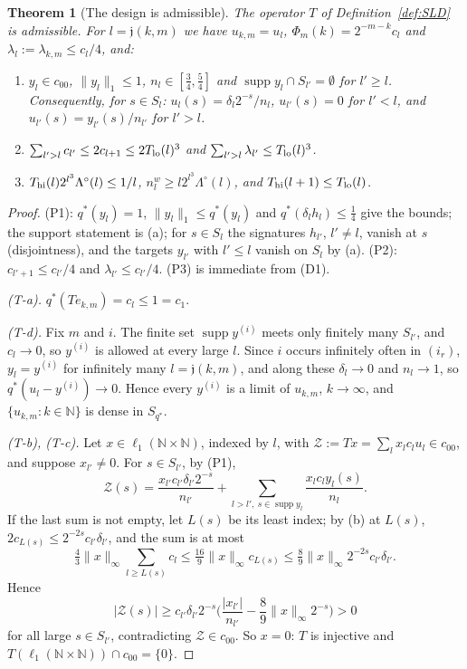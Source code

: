 \documentclass[10pt]{amsart}
\newtheorem{theorem}{Theorem}[section]
\theoremstyle{definition}
\theoremstyle{remark}
\newcommand{\supp}{\operatorname{supp}}
\newcommand{\N}{\mathbb N}
\begin{document}
\begin{theorem}[The design is admissible]\label{thm:SLD}
The operator $T$ of Definition~\ref{def:SLD} is admissible.  For
$l=\mathfrak j(k,m)$ we have $u_{k,m}=u_l$, $\Phi_m(k)=2^{-m-k}c_l$ and
$\lambda_l:=\lambda_{k,m}\le c_l/4$, and:
\begin{enumerate}
\item[(P1)] $y_l\in c_{00}$, $\|y_l\|_1\le1$, $n_l\in[\frac34,\frac54]$ and
$\supp y_l\cap S_{l'}=\emptyset$ for $l'\ge l$.  Consequently, for
$s\in S_l$: $u_l(s)=\delta_l2^{-s}/n_l$, $u_{l'}(s)=0$ for $l'<l$, and
$u_{l'}(s)=y_{l'}(s)/n_{l'}$ for $l'>l$.
\item[(P2)] $\sum_{l'>l}c_{l'}\le2c_{l+1}\le2T_{\rm lo}(l)^3$ and
$\sum_{l'>l}\lambda_{l'}\le T_{\rm lo}(l)^3$.
\item[(P3)] $T_{\rm hi}(l)2^{l^3}\Lambda^\circ(l)\le1/l$,
$n^w_l\ge l2^{l^3}\Lambda^\circ(l)$, and $T_{\rm hi}(l+1)\le T_{\rm lo}(l)$.
\end{enumerate}
\end{theorem}

\begin{proof}
(P1): $q^*(y_l)=1$, $\|y_l\|_1\le q^*(y_l)$ and $q^*(\delta_lh_l)\le\frac14$
give the bounds; the support statement is (a); for $s\in S_l$ the
signatures $h_{l'}$, $l'\ne l$, vanish at $s$ (disjointness), and the targets
$y_{l'}$ with $l'\le l$ vanish on $S_l$ by (a).  (P2): $c_{l'+1}\le
c_{l'}/4$ and $\lambda_{l'}\le c_{l'}/4$.  (P3) is immediate from (D1).

\emph{(T-a).} $q^*(Te_{k,m})=c_l\le1=c_1$.

\emph{(T-d).}  Fix $m$ and $i$.  The finite set $\supp y^{(i)}$ meets only
finitely many $S_{l'}$, and $c_l\to0$, so $y^{(i)}$ is allowed at every
large $l$.  Since $i$ occurs infinitely often in $(i_r)$, $y_l=y^{(i)}$ for
infinitely many $l=\mathfrak j(k,m)$, and along these $\delta_l\to0$ and
$n_l\to1$, so $q^*(u_l-y^{(i)})\to0$.  Hence every $y^{(i)}$ is a limit of
$u_{k,m}$, $k\to\infty$, and $\{u_{k,m}:k\in\N\}$ is dense in $S_{q^*}$.

\emph{(T-b), (T-c).}  Let $x\in\ell_1(\N\times\N)$, indexed by $l$, with
$\mathcal Z:=T x=\sum_lx_lc_lu_l\in c_{00}$, and suppose $x_{l'}\ne0$.  For
$s\in S_{l'}$, by (P1),
\[
 \mathcal Z(s)=\frac{x_{l'}c_{l'}\delta_{l'}2^{-s}}{n_{l'}}+\sum_{l>l',\
 s\in\supp y_l}\frac{x_lc_ly_l(s)}{n_l}.
\]
If the last sum is not empty, let $L(s)$ be its least index; by (b) at
$L(s)$, $2c_{L(s)}\le2^{-2s}c_{l'}\delta_{l'}$, and the sum is at most
\[
 \tfrac43\|x\|_\infty\sum_{l\ge L(s)}c_l\le\tfrac{16}9\|x\|_\infty c_{L(s)}\le
 \tfrac89\|x\|_\infty2^{-2s}c_{l'}\delta_{l'}.
\]
Hence
\[
 |\mathcal Z(s)|\ge c_{l'}\delta_{l'}2^{-s}\Big(\frac{|x_{l'}|}{n_{l'}}
 -\frac89\|x\|_\infty2^{-s}\Big)>0
\]
for all large $s\in S_{l'}$, contradicting $\mathcal Z\in c_{00}$.  So
$x=0$: $T$ is injective and $T(\ell_1(\N\times\N))\cap c_{00}=\{0\}$.
\end{proof}
\end{document}
